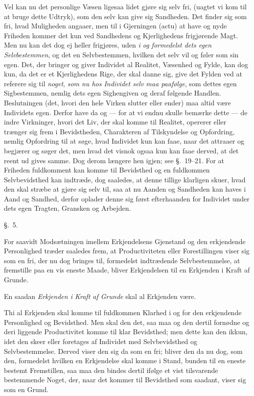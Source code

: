 \documentclass[12pt,a4paper]{book}
\newcommand{\apage}[1]{\marginnote{\footnotesize\textit{[#1]}}}
\begin{document}
Vel kan nu det personlige Væsen ligesaa lidet gjøre sig selv fri, (uagtet vi kom
til at bruge dette Udtryk), som den selv kan give sig Sandheden. Det finder sig
som fri, hvad Muligheden angaaer, men til i Gjerningen (actu) at have og nyde
Friheden kommer det kun ved Sandhedens og Kjerlighedens frigjørende Magt. Men nu
kan det dog ej heller frigjøres, uden \emph{i og formedelst dets egen
Selvbestemmen}, og det en Selvbestemmen, hvilken det selv vil og føler som sin
egen. Det, der bringer og giver Individet al Realitet, Væsenhed og Fylde, kan
dog kun, da det er et Kjerlighedens Rige, der skal danne sig, give det Fylden ved
at referere sig til \emph{noget}, \emph{som nu hos Individet selv maa paafølge},
som dettes egen Sigbestemmen, nemlig dets egen Sighengiven og deraf følgende
Handlen. Beslutningen (det, hvori den hele Virken slutter eller ender) maa altid
være Individets egen. Derfor have da og --- for at vi endnu skulle bemærke
dette --- de indre Virkninger, hvori det Liv, der skal komme til Realitet,
opererer eller trænger sig frem i Bevidstheden, Charakteren  \apage{36} af Tilskyndelse og
Opfordring, nemlig Opfordring til at søge, hvad Individet kun kan faae, naar det
attraaer og begjærer og søger det, men hvad det visnok ogsaa kun kan faae
derved, at det reent ud gives samme. Dog derom længere hen igjen; see
§.~19--21. For at Friheden fuldkomment kan komme til Bevidsthed og en fuldkommen
Selvbevidsthed kan indtræde, dog saaledes, at denne tillige klarligen skuer,
hvad den skal stræbe at gjøre sig selv til, saa at nu Aanden og Sandheden kan
haves i Aand og Sandhed, derfor oplader denne sig først efterhaanden for
Individet under dets egen Tragten, Gransken og Arbejden.

\begin{center}\large\S.~5.\end{center}

For saavidt Modsætningen imellem Erkjendelsens Gjenstand og den erkjendende
Personlighed træder saaledes frem, at Productiviteten eller Forestillingen viser
sig som en fri, der nu dog bringes til, formedelst indtrædende Selvbestemmelse,
at fremstille paa en vis eneste Maade, bliver Erkjendelsen til en Erkjenden i
Kraft af Grunde.

En saadan \emph{Erkjenden i Kraft af Grunde} skal al Erkjenden være.

Thi al Erkjenden skal komme til fuldkommen Klarhed i og for den erkjendende
Personlighed og Bevidsthed. Men skal den det, saa maa og den dertil fornødne og
deri liggende Productivitet  \apage{37} komme til klar Bevidsthed; men dette kan den ikkun,
idet den skeer eller foretages af Individet med Selvbevidsthed og
Selvbestemmelse. Derved viser den sig da som en fri; bliver den da nu dog, som
den, formedelst hvilken en Erkjendelse skal komme i Stand, bunden til en eneste
bestemt Fremstillen, saa maa den bindes dertil ifølge et vist tilsvarende
bestemmende Noget, der, naar det kommer til Bevidsthed som saadant, viser sig som
en Grund.
\end{document}
